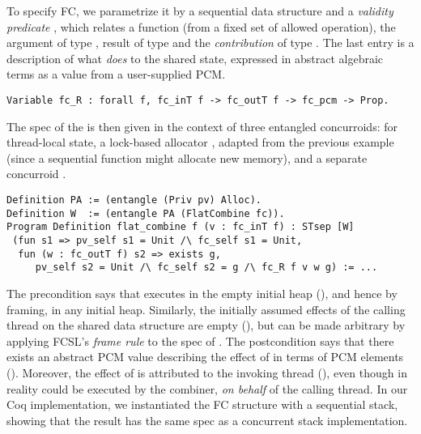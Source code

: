 To specify FC, we parametrize it by a sequential data structure and a
\emph{validity predicate} , which relates a function
 (from a fixed set of allowed operation), the argument of type
, result of type  and the
\emph{contribution} of type . The last entry is a
description of what  \emph{does} to the shared state,
expressed in abstract algebraic terms as a value from a user-supplied
PCM.
%
\begin{lstlisting}
Variable fc_R : forall f, fc_inT f -> fc_outT f -> fc_pcm -> Prop.
\end{lstlisting}
%
The spec of the  is then given in the context of
three entangled concurroids:  for thread-local state, a
lock-based allocator , adapted from the previous example
(since a sequential function  might allocate new memory), and
a separate concurroid .
%
\begin{lstlisting}
Definition PA := (entangle (Priv pv) Alloc).
Definition W  := (entangle PA (FlatCombine fc)).  
Program Definition flat_combine f (v : fc_inT f) : STsep [W] 
 (fun s1 => pv_self s1 = Unit /\ fc_self s1 = Unit,
  fun (w : fc_outT f) s2 => exists g,
     pv_self s2 = Unit /\ fc_self s2 = g /\ fc_R f v w g) := ...
\end{lstlisting}
% 
The precondition says that  executes in the empty
initial heap (), and hence by framing, in any
initial heap. Similarly, the initially assumed effects of the calling
thread on the shared data structure are empty (), but can be made arbitrary by applying FCSL's \emph{frame
  rule} to the spec of .
%
The postcondition says that there exists an abstract PCM value
 describing the effect of  in terms of PCM elements
(). Moreover, the effect of  is attributed
to the invoking thread (), even though in reality
 could be executed by the combiner, \emph{on behalf} of the
calling thread.
%
In our Coq implementation, we instantiated the FC structure with a sequential
stack, showing that the result has the same spec as a concurrent stack
implementation.

